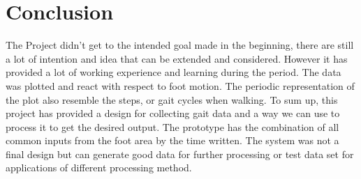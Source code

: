 \documentclass[12 pt, a4paper]{thesis}
\begin{document}
\chapter{Conclusion}
The Project didn't get to the intended goal made in the beginning, there are still a lot of intention and idea that can be extended and considered. However it has provided a lot of working experience and learning during the period. The data was plotted and react with respect to foot motion. The periodic representation of the plot also resemble the steps, or gait cycles when walking. 
To sum up, this project has provided a design for collecting gait data and a way we can use to process it to get the desired output. The prototype has the combination of all common inputs from the foot area by the time written. The system was not a final design but can generate good data for further processing or test data set for applications of different processing method.   
\end{document}
